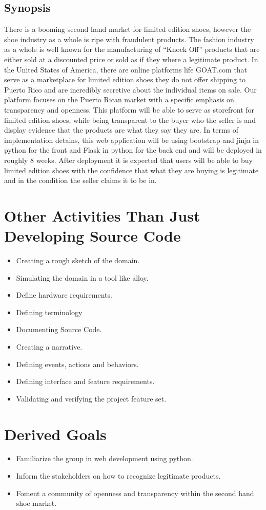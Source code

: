 \subsection{Synopsis}
There is a booming second hand market for limited edition shoes, however the shoe industry as a whole is ripe with fraudulent products. The fashion industry as a whole is well known for the manufacturing of ``Knock Off'' products that are either sold at a discounted price or sold as if they where a legitimate product. In the United States of America, there are online platforms life GOAT.com that serve as a marketplace for limited edition shoes they do not offer shipping to Puerto Rico and are incredibly secretive about the individual items on sale. Our platform focuses on the Puerto Rican market with a specific emphasis on transparency and openness. This platform will be able to serve as storefront for limited edition shoes, while being transparent to the buyer who the seller is and display evidence that the products are what they say they are. In terms of implementation detains, this web application will be using bootstrap and jinja in python for the front and Flask in python for the back end and will be deployed in roughly 8 weeks. After deployment it is expected that users will be able to buy limited edition shoes with the confidence that what they are buying is legitimate and in the condition the seller claims it to be in.
\section{Other Activities Than Just Developing Source Code}
\begin{itemize}
  \item Creating a rough sketch of the domain.
  \item Simulating the domain in a tool like alloy.
  \item Define hardware requirements.
  \item Defining terminology
  \item Documenting Source Code.
  \item Creating a narrative.
  \item Defining events, actions and behaviors.
  \item Defining interface and feature requirements.
  \item Validating and verifying the project feature set.
\end{itemize}
\section{Derived Goals}
\begin{itemize}
  \item Familiarize the group in web development using python.
  \item Inform the stakeholders on how to recognize legitimate products.
  \item Foment a community of openness and transparency within the second hand shoe market.
\end{itemize}
